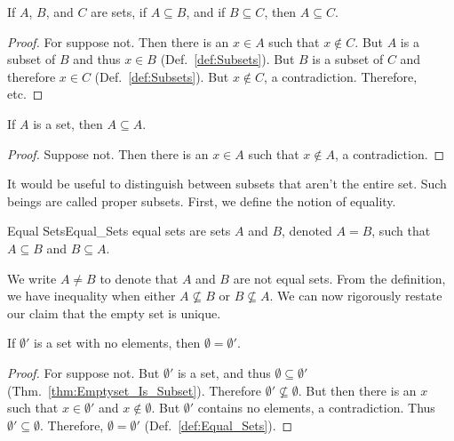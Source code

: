             \begin{theorem}
                \label{thm:Subset_is_Transitive}%
                If $A$, $B$, and $C$ are sets, if $A\subseteq{B}$, and if
                $B\subseteq{C}$, then $A\subseteq{C}$.
            \end{theorem}
            \begin{proof}
                For suppose not. Then there is an $x\in{A}$ such that
                $x\notin{C}$. But $A$ is a subset of $B$ and thus $x\in{B}$
                (Def.~\ref{def:Subsets}). But $B$ is a subset of $C$ and
                therefore $x\in{C}$ (Def.~\ref{def:Subsets}). But $x\notin{C}$,
                a contradiction. Therefore, etc.
            \end{proof}
            \begin{theorem}
                \label{thm:Set_Is_Subset_Of_Self}%
                If $A$ is a set, then $A\subseteq{A}$.
            \end{theorem}
            \begin{proof}
                Suppose not. Then there is an $x\in{A}$
                such that $x\notin{A}$, a contradiction.
            \end{proof}
            It would be useful to distinguish between subsets that aren't the
            entire set. Such beings are called proper subsets. First, we
            define the notion of equality.
            \begin{ldefinition}{Equal Sets}{Equal_Sets}
                \Glspl{equal set} are sets $A$ and $B$, denoted $A=B$, such
                that $A\subseteq{B}$ and $B\subseteq{A}$.
            \end{ldefinition}
            We write $A\ne{B}$ to denote that $A$ and $B$ are not equal sets.
            From the definition, we have inequality when either
            $A\nsubseteq{B}$ or $B\nsubseteq{A}$. We can now rigorously restate
            our claim that the empty set is unique.
            \begin{theorem}
                If $\emptyset'$ is a set with no elements,
                then $\emptyset=\emptyset'$.
            \end{theorem}
            \begin{proof}
                For suppose not. But $\emptyset'$ is a set, and thus
                $\emptyset\subseteq\emptyset'$
                (Thm.~\ref{thm:Emptyset_Is_Subset}). Therefore
                $\emptyset'\nsubseteq\emptyset$. But then there is an $x$ such
                that $x\in\emptyset'$ and $x\notin\emptyset$. But $\emptyset'$
                contains no elements, a contradiction. Thus
                $\emptyset'\subseteq\emptyset$. Therefore,
                $\emptyset=\emptyset'$ (Def.~\ref{def:Equal_Sets}).
            \end{proof}
